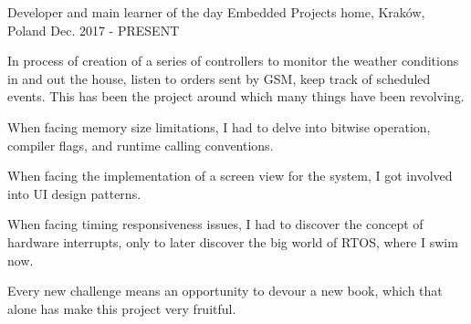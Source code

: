 

\begin{cventries}

\cventry
	{Developer and main learner of the day}
	{Embedded Projects}
	{home, Kraków, Poland}
	{Dec. 2017 - PRESENT}
	{
		\begin{cvitems} %
			\item {In process of creation of a series of controllers to monitor the weather conditions in and out the house, listen to orders sent by GSM, keep track of scheduled events. This has been the project around which many things have been revolving.}
			\item {When facing memory size limitations, I had to delve into bitwise operation, compiler flags, and runtime calling conventions.}
			\item {When facing the implementation of a screen view for the system, I got involved into UI design patterns.}
	        \item {When facing timing responsiveness issues, I had to discover the concept of hardware interrupts, only to later discover the big world of RTOS, where I swim now.}
			\item {Every new challenge means an opportunity to devour a new book, which that alone has make this project very fruitful.}
		\end{cvitems}
	}


\end{cventries}
